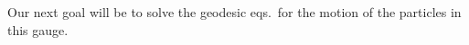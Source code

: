 \documentclass[main.tex]{subfiles}
\begin{document}




% 



Our next goal will be to solve the geodesic eqs.\  for the motion of the particles in this gauge. 
\end{document}

